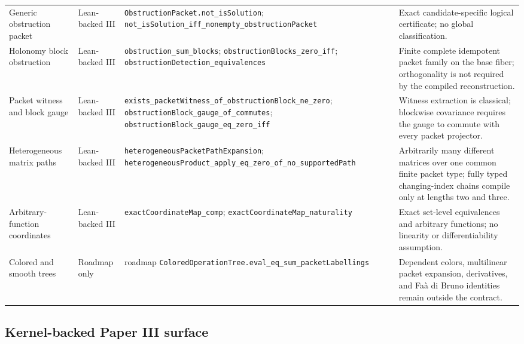 \documentclass[11pt]{article}
\theoremstyle{definition}
\theoremstyle{remark}
\newcommand{\leanname}[1]{\nolinkurl{#1}}
\begin{document}
\begin{longtable}{L{0.17\textwidth}L{0.18\textwidth}L{0.25\textwidth}L{0.22\textwidth}}
\addlinespace
Generic obstruction packet
& Lean-backed III
& \leanname{ObstructionPacket.not_isSolution}; \leanname{not_isSolution_iff_nonempty_obstructionPacket}
& Exact candidate-specific logical certificate; no global classification.\\
\addlinespace
Holonomy block obstruction
& Lean-backed III
& \leanname{obstruction_sum_blocks}; \leanname{obstructionBlocks_zero_iff}; \leanname{obstructionDetection_equivalences}
& Finite complete idempotent packet family on the base fiber; orthogonality is not required by the compiled reconstruction.\\
\addlinespace
Packet witness and block gauge
& Lean-backed III
& \leanname{exists_packetWitness_of_obstructionBlock_ne_zero}; \leanname{obstructionBlock_gauge_of_commutes}; \leanname{obstructionBlock_gauge_eq_zero_iff}
& Witness extraction is classical; blockwise covariance requires the gauge to commute with every packet projector.\\
\addlinespace
Heterogeneous matrix paths
& Lean-backed III
& \leanname{heterogeneousPacketPathExpansion}; \leanname{heterogeneousProduct_apply_eq_zero_of_no_supportedPath}
& Arbitrarily many different matrices over one common finite packet type; fully typed changing-index chains compile only at lengths two and three.\\
\addlinespace
Arbitrary-function coordinates
& Lean-backed III
& \leanname{exactCoordinateMap_comp}; \leanname{exactCoordinateMap_naturality}
& Exact set-level equivalences and arbitrary functions; no linearity or differentiability assumption.\\
\addlinespace
Colored and smooth trees
& Roadmap only
& roadmap \leanname{ColoredOperationTree.eval_eq_sum_packetLabellings}
& Dependent colors, multilinear packet expansion, derivatives, and Fa\`a di Bruno identities remain outside the contract.\\
\bottomrule
\end{longtable}
\normalsize

\subsection{Kernel-backed Paper III surface}
\end{document}
